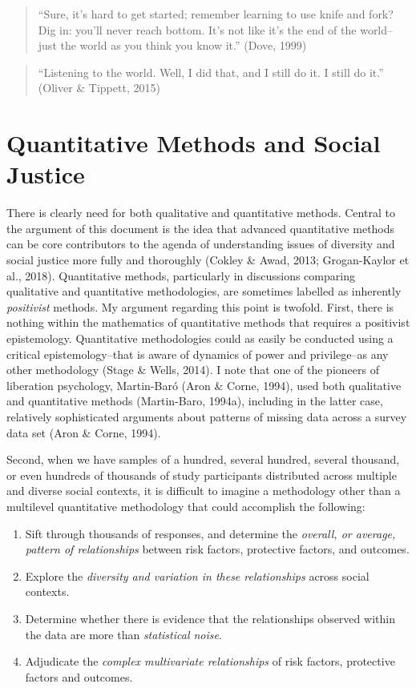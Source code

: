 \documentclass[
  letterpaper,
  DIV=11,
  numbers=noendperiod]{scrreprt}
\providecommand{\tightlist}{%
  \setlength{\itemsep}{0pt}\setlength{\parskip}{0pt}}\usepackage{longtable,booktabs,array}
\begin{document}
\begin{quote}
``Sure, it's hard to get started; remember learning to use knife and
fork? Dig in: you'll never reach bottom. It's not like it's the end of
the world--just the world as you think you know it.'' (Dove, 1999)
\end{quote}

\begin{quote}
``Listening to the world. Well, I did that, and I still do it. I still
do it.'' (Oliver \& Tippett, 2015)
\end{quote}

\section{Quantitative Methods and Social
Justice}\label{quantitative-methods-and-social-justice}

There is clearly need for both qualitative and quantitative methods.
Central to the argument of this document is the idea that advanced
quantitative methods can be core contributors to the agenda of
understanding issues of diversity and social justice more fully and
thoroughly (Cokley \& Awad, 2013; Grogan-Kaylor et al., 2018).
Quantitative methods, particularly in discussions comparing qualitative
and quantitative methodologies, are sometimes labelled as inherently
\emph{positivist} methods. My argument regarding this point is twofold.
First, there is nothing within the mathematics of quantitative methods
that requires a positivist epistemology. Quantitative methodologies
could as easily be conducted using a critical epistemology--that is
aware of dynamics of power and privilege--as any other methodology
(Stage \& Wells, 2014). I note that one of the pioneers of liberation
psychology, Martin-Baró (Aron \& Corne, 1994), used both qualitative and
quantitative methods (Martin-Baro, 1994a), including in the latter case,
relatively sophisticated arguments about patterns of missing data across
a survey data set (Aron \& Corne, 1994).

Second, when we have samples of a hundred, several hundred, several
thousand, or even hundreds of thousands of study participants
distributed across multiple and diverse social contexts, it is difficult
to imagine a methodology other than a multilevel quantitative
methodology that could accomplish the following:

\begin{enumerate}
\def\labelenumi{\arabic{enumi}.}
\tightlist
\item
  Sift through thousands of responses, and determine the \emph{overall,
  or average, pattern of relationships} between risk factors, protective
  factors, and outcomes.
\item
  Explore the \emph{diversity and variation in these relationships}
  across social contexts.
\item
  Determine whether there is evidence that the relationships observed
  within the data are more than \emph{statistical noise}.
\item
  Adjudicate the \emph{complex multivariate relationships} of risk
  factors, protective factors and outcomes.
\end{enumerate}
\end{document}
